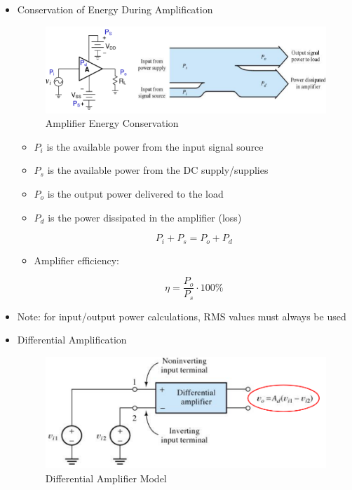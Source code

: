 \begin{itemize}
\begin{itemize}
    \end{itemize}

  \item Conservation of Energy During Amplification

    \begin{figure}[H]
      \centering
      \includegraphics[width=.7\textwidth]{Images/Amps.png}
      \caption{Amplifier Energy Conservation}
      \label{fig:5}
    \end{figure}

    \begin{itemize}

      \item $P_i$ is the available power from the input signal source

      \item $P_s$ is the available power from the DC supply/supplies

      \item $P_o$ is the output power delivered to the load

      \item $P_d$ is the power dissipated in the amplifier (loss)

        $$P_i+P_s=P_o+P_d$$

      \item Amplifier efficiency:

        $$\eta=\frac{P_o}{P_s}\cdot100\%$$

    \end{itemize}

  \item Note: for input/output power calculations, RMS values must always be used

  \item Differential Amplification

    \begin{figure}[H]
      \centering
      \includegraphics[width=.7\textwidth]{Images/DiffAmp.png}
      \caption{Differential Amplifier Model}
      \label{fig:6}
    \end{figure}


\end{itemize}

